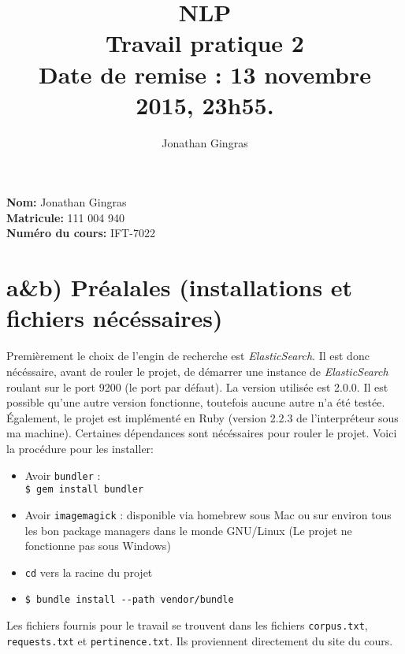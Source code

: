 \documentclass[12pt]{article}
\begin{document}
\title{NLP \\ Travail pratique 2 \\ Date de remise : 13 novembre 2015, 23h55.}
\author{Jonathan Gingras}

\maketitle

\begin{center}
\textbf{Nom:} Jonathan Gingras
\textbf{\\Matricule:} 111 004 940
\textbf{\\Numéro du cours:} IFT-7022
\end{center}

\clearpage


\section{a\&b) Préalales (installations et fichiers nécéssaires)}
Premièrement le choix de l'engin de recherche est \textit{ElasticSearch}. Il est donc nécéssaire, avant de rouler le projet, de démarrer une instance de \textit{ElasticSearch} roulant sur le port 9200 (le port par défaut). La version utilisée est 2.0.0. Il est possible qu'une autre version fonctionne, toutefois aucune autre n'a été testée.\\

Également, le projet est implémenté en Ruby (version 2.2.3 de l'interpréteur sous ma machine). Certaines dépendances sont nécéssaires pour rouler le projet. Voici la procédure pour les installer:\\

\begin{itemize}
\item Avoir \verb;bundler; :\\ \verb;$ gem install bundler;
\item Avoir \verb;imagemagick; : disponible via homebrew sous Mac ou sur environ tous les bon package managers dans le monde GNU/Linux (Le projet ne fonctionne pas sous Windows)
\item \verb;cd; vers la racine du projet
\item \verb;$ bundle install --path vendor/bundle;\\
\end{itemize}

Les fichiers fournis pour le travail se trouvent dans les fichiers \verb;corpus.txt;, \verb;requests.txt; et \verb;pertinence.txt;. Ils proviennent directement du site du cours. 
\end{document}
